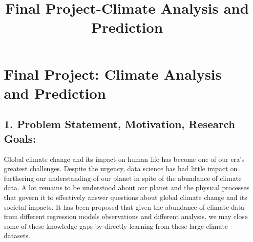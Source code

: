 \documentclass[11pt]{article}
\title{ Final Project-Climate Analysis and Prediction}
\begin{document}
    
    
    \maketitle
    
    

    
    \section{Final Project: Climate Analysis and
Prediction}\label{final-project-climate-analysis-and-prediction}

    \subsection{1. Problem Statement, Motivation, Research
Goals:}\label{problem-statement-motivation-research-goals}

    Global climate change and its impact on human life has become one of our
era's greatest challenges. Despite the urgency, data science has had
little impact on furthering our understanding of our planet in spite of
the abundance of climate data. A lot remains to be understood about our
planet and the physical processes that govern it to effectively answer
questions about global climate change and its societal impacts. It has
been proposed that given the abundance of climate data from different
regression models observations and different analysis, we may close some
of these knowledge gaps by directly learning from these large climate
datasets.
\end{document}
